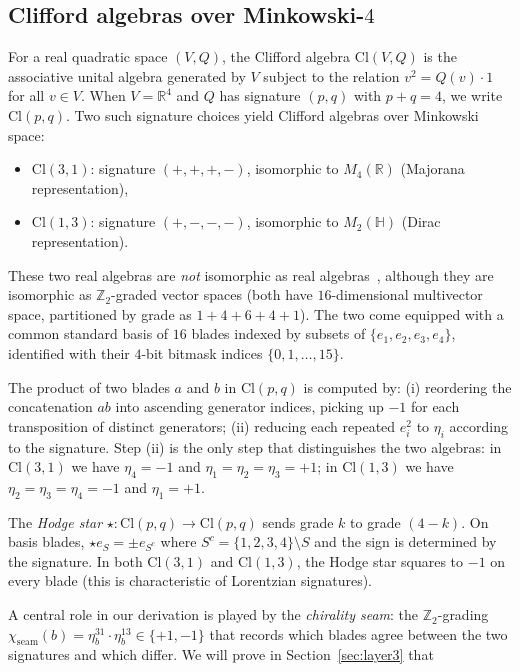 \documentclass[11pt,a4paper]{article}
\theoremstyle{plain}
\theoremstyle{definition}
\theoremstyle{remark}
\numberwithin{equation}{section}
\providecommand{\Cl}{\mathrm{Cl}}
\providecommand{\HH}{\mathbb{H}}
\providecommand{\ZZ}{\mathbb{Z}}
\providecommand{\RR}{\mathbb{R}}
\begin{document}
\subsection{Clifford algebras over Minkowski-$4$}\label{sec:bg-clifford}

For a real quadratic space $(V, Q)$, the Clifford algebra $\Cl(V,
Q)$ is the associative unital algebra generated by $V$ subject to
the relation $v^2 = Q(v) \cdot 1$ for all $v \in V$.  When
$V = \RR^4$ and $Q$ has signature $(p, q)$ with $p + q = 4$, we
write $\Cl(p, q)$.  Two such signature choices yield Clifford
algebras over Minkowski space:

\begin{itemize}
\item $\Cl(3,1)$: signature $(+,+,+,-)$, isomorphic to
      $M_4(\RR)$ (Majorana representation),
\item $\Cl(1,3)$: signature $(+,-,-,-)$, isomorphic to
      $M_2(\HH)$ (Dirac representation).
\end{itemize}

These two real algebras are \emph{not} isomorphic as real
algebras~\cite{lounesto2001}, although they are isomorphic as
$\ZZ_2$-graded vector spaces (both have $16$-dimensional
multivector space, partitioned by grade as $1 + 4 + 6 + 4 + 1$).
The two come equipped with a common standard basis of $16$ blades
indexed by subsets of $\{e_1, e_2, e_3, e_4\}$, identified with
their $4$-bit bitmask indices $\{0, 1, \ldots, 15\}$.

The product of two blades $a$ and $b$ in $\Cl(p,q)$ is computed
by: (i) reordering the concatenation $ab$ into ascending generator
indices, picking up $-1$ for each transposition of distinct
generators; (ii) reducing each repeated $e_i^2$ to $\eta_i$
according to the signature.  Step (ii) is the only step that
distinguishes the two algebras: in $\Cl(3,1)$ we have $\eta_4 =
-1$ and $\eta_1 = \eta_2 = \eta_3 = +1$; in $\Cl(1,3)$ we have
$\eta_2 = \eta_3 = \eta_4 = -1$ and $\eta_1 = +1$.

The \emph{Hodge star} $\star : \Cl(p,q) \to \Cl(p,q)$ sends grade $k$
to grade $(4-k)$.  On basis blades, $\star e_S = \pm e_{S^c}$
where $S^c = \{1,2,3,4\} \setminus S$ and the sign is determined by
the signature.  In both $\Cl(3,1)$ and $\Cl(1,3)$, the Hodge star
squares to $-1$ on every blade (this is characteristic of
Lorentzian signatures).

A central role in our derivation is played by the \emph{chirality
seam}: the $\ZZ_2$-grading
$\chi_{\mathrm{seam}}(b) = \eta_b^{31} \cdot \eta_b^{13} \in
\{+1, -1\}$ that records which blades agree between the two
signatures and which differ.  We will prove in
Section~\ref{sec:layer3} that
\end{document}

